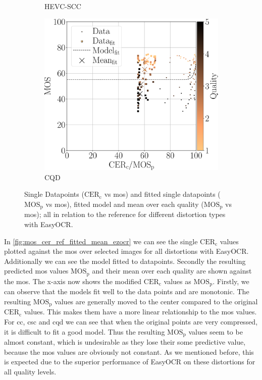 \begin{figure}[h!]
\begin{subfigure}[b]{0.3\textwidth}
        \caption{HEVC-SCC}
        \label{fig:mos_cer_ref_fitted_mean_ezocr_HEVC-SCC}
    \end{subfigure}
    \hfill
    \begin{subfigure}[b]{0.3\textwidth}
        \includegraphics[width=\textwidth]{../../images/analyze/mos_cer_ref_fitted_mean_ezocr_CQD.pdf}
        \caption{CQD}
        \label{fig:mos_cer_ref_fitted_mean_ezocr_CQD}
    \end{subfigure}
    \caption{Single Datapoints ($\text{CER}_{\text{c}}$ vs \gls{mos}) and fitted single datapoints ($\text{MOS}_{\text{p}}$ vs \gls{mos}), fitted model and mean over each quality ($\text{MOS}_{\text{p}}$ vs \gls{mos}); all in relation to the reference for different distortion types with EasyOCR.}
\label{fig:mos_cer_ref_fitted_mean_ezocr}
\end{figure}

In \autoref{fig:mos_cer_ref_fitted_mean_ezocr} we can see the single $\text{CER}_{\text{c}}$ values plotted against the \gls{mos} over selected images for all distortions with EasyOCR.
Additionally we can see the model fitted to datapoints.
Secondly the resulting predicted \gls{mos} values $\text{MOS}_{\text{p}}$ and their mean over each quality are shown against the \gls{mos}.
The x-axis now shows the modified $\text{CER}_{\text{c}}$ values as $\text{MOS}_{\text{p}}$.
Firstly, we can observe that the models fit well to the data points and are monotonic.
The resulting $\text{MOS}_{\text{p}}$ values are generally moved to the center compared to the original $\text{CER}_{\text{c}}$ values.
This makes them have a more linear relationship to the \gls{mos} values.
For \gls{cc}, \gls{csc} and \gls{cqd} we can see that when the original points are very compressed, it is difficult to fit a good model.
Thus the resulting $\text{MOS}_{\text{p}}$ values seem to be almost constant, which is undesirable as they lose their some predictive value, because the \gls{mos} values are obviously not constant.
As we mentioned before, this is expected due to the superior performance of EasyOCR on these distortions for all quality levels.

